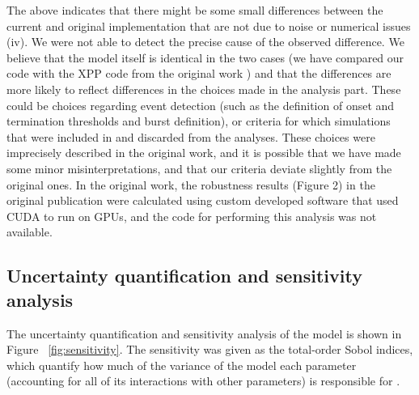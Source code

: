\documentclass[10pt,a4paper,onecolumn]{article}
\begin{document}
The above indicates that there might be some small differences between
the current and original implementation that are not due to noise or
numerical issues (iv). We were not able to detect the precise cause of
the observed difference. We believe that the model itself is identical
in the two cases (we have compared our code with the XPP code from the
original work \autocite{tabak2011}) and that the differences are more
likely to reflect differences in the choices made in the analysis part.
These could be choices regarding event detection (such as the definition
of onset and termination thresholds and burst definition), or criteria
for which simulations that were included in and discarded from the
analyses. These choices were imprecisely described in the original work,
and it is possible that we have made some minor misinterpretations, and
that our criteria deviate slightly from the original ones. In the
original work, the robustness results (Figure 2) in the original
publication were calculated using custom developed software that used
CUDA to run on GPUs, and the code for performing this analysis was not
available.

\subsection{Uncertainty quantification and sensitivity
analysis}\label{uncertainty-quantification-and-sensitivity-analysis-1}

The uncertainty quantification and sensitivity analysis of the model is
shown in Figure ~\ref{fig:sensitivity}. The sensitivity was given as the
total-order Sobol indices, which quantify how much of the variance of
the model each parameter (accounting for all of its interactions with
other parameters) is responsible for \autocite{homma1996}.
\end{document}
